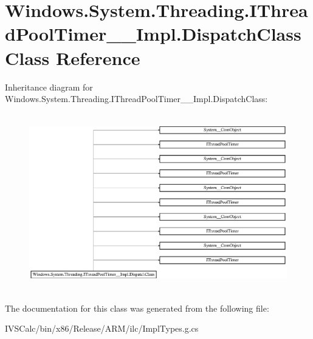 \hypertarget{class_windows_1_1_system_1_1_threading_1_1_i_thread_pool_timer_____impl_1_1_dispatch_class}{}\section{Windows.\+System.\+Threading.\+I\+Thread\+Pool\+Timer\+\_\+\+\_\+\+Impl.\+Dispatch\+Class Class Reference}
\label{class_windows_1_1_system_1_1_threading_1_1_i_thread_pool_timer_____impl_1_1_dispatch_class}
Inheritance diagram for Windows.\+System.\+Threading.\+I\+Thread\+Pool\+Timer\+\_\+\+\_\+\+Impl.\+Dispatch\+Class\+:\begin{figure}[H]
\begin{center}
\leavevmode
\includegraphics[height=7.738694cm]{class_windows_1_1_system_1_1_threading_1_1_i_thread_pool_timer_____impl_1_1_dispatch_class}
\end{center}
\end{figure}


The documentation for this class was generated from the following file\+:\begin{DoxyCompactItemize}
\item 
I\+V\+S\+Calc/bin/x86/\+Release/\+A\+R\+M/ilc/Impl\+Types.\+g.\+cs\end{DoxyCompactItemize}

